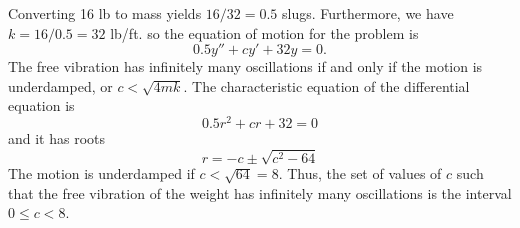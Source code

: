 \documentclass[11pt, titlepage]{article}
\begin{document}
    \begin{solution}
        Converting 16 lb to mass yields $16 / 32 = 0.5$ slugs. Furthermore, we
        have $k = 16 / 0.5 = 32$ lb/ft. so the equation of motion for the
        problem is
        \[
        0.5y'' + cy' + 32y = 0.
        \] 
        The free vibration has infinitely many oscillations if and only if the
        motion is underdamped, or $c < \sqrt{4mk}$. The characteristic equation
        of the differential equation is
        \[
        0.5r^2 + cr + 32 = 0
        \] 
        and it has roots
        \[
        r = -c \pm \sqrt{c^2 - 64}
        \] 
        The motion is underdamped if $c < \sqrt{64} = 8$. Thus, the set of
        values of $c$ such that the free vibration of the weight has infinitely
        many oscillations is the interval $0 \leq c < 8$.
    \end{solution}
\end{document}
